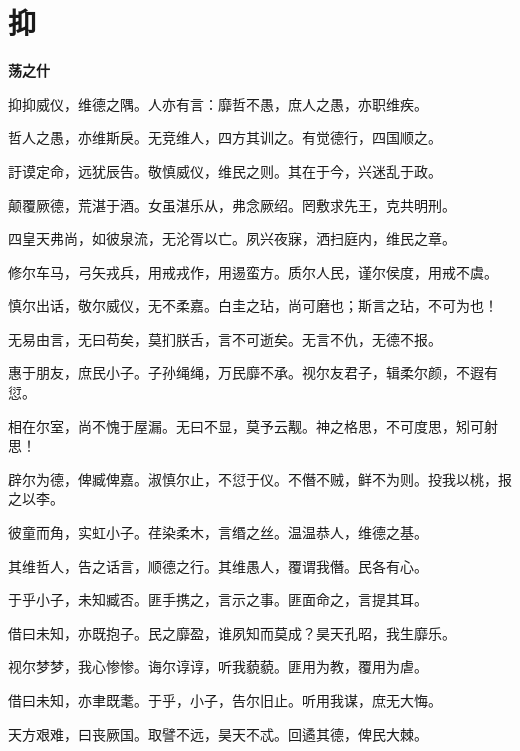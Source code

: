 \documentclass[12pt,a4paper]{ctexbook}
\begin{document}
\section{抑}
\textbf{荡之什}\par\vspace{0.5em}
抑抑威仪，维德之隅。人亦有言：靡哲不愚，庶人之愚，亦职维疾。\par
哲人之愚，亦维斯戾。无竞维人，四方其训之。有觉德行，四国顺之。\par
訏谟定命，远犹辰告。敬慎威仪，维民之则。其在于今，兴迷乱于政。\par
颠覆厥德，荒湛于酒。女虽湛乐从，弗念厥绍。罔敷求先王，克共明刑。\par
四皇天弗尚，如彼泉流，无沦胥以亡。夙兴夜寐，洒扫庭内，维民之章。\par
修尔车马，弓矢戎兵，用戒戎作，用逷蛮方。质尔人民，谨尔侯度，用戒不虞。\par
慎尔出话，敬尔威仪，无不柔嘉。白圭之玷，尚可磨也；斯言之玷，不可为也！\par
无易由言，无曰苟矣，莫扪朕舌，言不可逝矣。无言不仇，无德不报。\par
惠于朋友，庶民小子。子孙绳绳，万民靡不承。视尔友君子，辑柔尔颜，不遐有愆。\par
相在尔室，尚不愧于屋漏。无曰不显，莫予云觏。神之格思，不可度思，矧可射思！\par
辟尔为德，俾臧俾嘉。淑慎尔止，不愆于仪。不僭不贼，鲜不为则。投我以桃，报之以李。\par
彼童而角，实虹小子。荏染柔木，言缗之丝。温温恭人，维德之基。\par
其维哲人，告之话言，顺德之行。其维愚人，覆谓我僭。民各有心。\par
于乎小子，未知臧否。匪手携之，言示之事。匪面命之，言提其耳。\par
借曰未知，亦既抱子。民之靡盈，谁夙知而莫成？昊天孔昭，我生靡乐。\par
视尔梦梦，我心惨惨。诲尔谆谆，听我藐藐。匪用为教，覆用为虐。\par
借曰未知，亦聿既耄。于乎，小子，告尔旧止。听用我谋，庶无大悔。\par
天方艰难，曰丧厥国。取譬不远，昊天不忒。回遹其德，俾民大棘。\par
\end{document}
